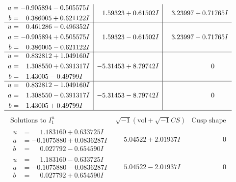 \documentclass[1p]{elsarticle_modified}
\theoremstyle{definition}
\newcommand{\I}{\sqrt{-1}}
\begin{document}
$$\begin{array}{c|c|c}
\begin{aligned}
a &= -0.905894 - 0.505575 I \\
b &= \phantom{-}0.386005 + 0.621122 I\end{aligned}
 & \phantom{-}1.59323 + 0.61502 I & \phantom{-}3.23997 + 0.71765 I \\ \hline\begin{aligned}
u &= \phantom{-}0.461286 - 0.496352 I \\
a &= -0.905894 + 0.505575 I \\
b &= \phantom{-}0.386005 - 0.621122 I\end{aligned}
 & \phantom{-}1.59323 - 0.61502 I & \phantom{-}3.23997 - 0.71765 I \\ \hline\begin{aligned}
u &= \phantom{-}0.832812 + 1.049160 I \\
a &= \phantom{-}1.308550 + 0.391317 I \\
b &= \phantom{-}1.43005 - 0.49799 I\end{aligned}
 & -5.31453 + 8.79742 I & \phantom{-0.000000 } 0 \\ \hline\begin{aligned}
u &= \phantom{-}0.832812 - 1.049160 I \\
a &= \phantom{-}1.308550 - 0.391317 I \\
b &= \phantom{-}1.43005 + 0.49799 I\end{aligned}
 & -5.31453 - 8.79742 I & \phantom{-0.000000 } 0\\
 \hline 
 \end{array}$$\newpage$$\begin{array}{c|c|c}  
\text{Solutions to }I^u_{1}& \I (\text{vol} + \sqrt{-1}CS) & \text{Cusp shape}\\
 \hline 
\begin{aligned}
u &= \phantom{-}1.183160 + 0.633725 I \\
a &= -0.1075880 + 0.0836287 I \\
b &= \phantom{-}0.027792 - 0.654590 I\end{aligned}
 & \phantom{-}5.04522 + 2.01937 I & \phantom{-0.000000 } 0 \\ \hline\begin{aligned}
u &= \phantom{-}1.183160 - 0.633725 I \\
a &= -0.1075880 - 0.0836287 I \\
b &= \phantom{-}0.027792 + 0.654590 I\end{aligned}
 & \phantom{-}5.04522 - 2.01937 I & \phantom{-0.000000 } 0 \\ \hline\begin{aligned}

\end{aligned}
\end{array}$$
\end{document}
